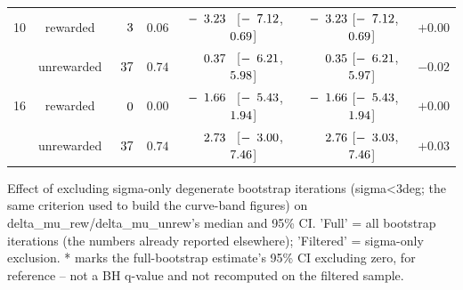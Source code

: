 \begin{table}[htbp]
{\begin{tabular}{lcccccc}
10 & rewarded & $\hphantom{00}3$ & $0.06$ & $-\hphantom{0}3.23^{\hphantom{*}}$ [$-\hphantom{0}7.12$, $\hphantom{-}\hphantom{0}0.69$] & $-\hphantom{0}3.23$ [$-\hphantom{0}7.12$, $\hphantom{-}\hphantom{0}0.69$] & $+0.00$ \\
 & unrewarded & $\hphantom{0}37$ & $0.74$ & $\hphantom{-}\hphantom{0}0.37^{\hphantom{*}}$ [$-\hphantom{0}6.21$, $\hphantom{-}\hphantom{0}5.98$] & $\hphantom{-}\hphantom{0}0.35$ [$-\hphantom{0}6.21$, $\hphantom{-}\hphantom{0}5.97$] & $-0.02$ \\
16 & rewarded & $\hphantom{00}0$ & $0.00$ & $-\hphantom{0}1.66^{\hphantom{*}}$ [$-\hphantom{0}5.43$, $\hphantom{-}\hphantom{0}1.94$] & $-\hphantom{0}1.66$ [$-\hphantom{0}5.43$, $\hphantom{-}\hphantom{0}1.94$] & $+0.00$ \\
 & unrewarded & $\hphantom{0}37$ & $0.74$ & $\hphantom{-}\hphantom{0}2.73^{\hphantom{*}}$ [$-\hphantom{0}3.00$, $\hphantom{-}\hphantom{0}7.46$] & $\hphantom{-}\hphantom{0}2.76$ [$-\hphantom{0}3.03$, $\hphantom{-}\hphantom{0}7.46$] & $+0.03$ \\
\bottomrule
\end{tabular}
}
\vspace{4pt}
\par\noindent
\begin{minipage}{\linewidth}\small Effect of excluding sigma-only degenerate bootstrap iterations (sigma<3deg; the same criterion used to build the curve-band figures) on delta\_mu\_rew/delta\_mu\_unrew's median and 95\% CI. 'Full' = all bootstrap iterations (the numbers already reported elsewhere); 'Filtered' = sigma-only exclusion. * marks the full-bootstrap estimate's 95\% CI excluding zero, for reference -- not a BH q-value and not recomputed on the filtered sample.\end{minipage}
\end{table}
